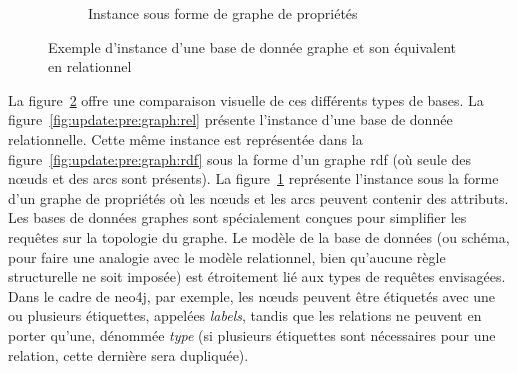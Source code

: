 \begin{figure}[p]
\begin{minipage}[][\textheight][c]{\textwidth}
\begin{subfigure}[t]{\linewidth}
\begin{adjustbox}{width=\linewidth, max height=.25\textheight}
            \end{adjustbox}
            \caption{Instance sous forme de graphe de propriétés}
            \label{fig:update:pre:graph:prop}
        \end{subfigure}
        \caption{Exemple d'instance d'une base de donnée graphe et son équivalent en relationnel}
        \label{fig:update:pre:graph}
    \end{minipage}
\end{figure}

La figure~\ref{fig:update:pre:graph} offre une comparaison visuelle de ces différents types de bases.
La figure~\ref{fig:update:pre:graph:rel} présente l'instance d'une base de donnée relationnelle.
Cette même instance est représentée dans la figure~\ref{fig:update:pre:graph:rdf} sous la forme d'un graphe \gls{rdf} (où seule des nœuds et des arcs sont présents).
La figure~\ref{fig:update:pre:graph:prop} représente l'instance sous la forme d'un graphe de propriétés où les nœuds et les arcs peuvent contenir des attributs.
Les bases de données graphes sont spécialement conçues pour simplifier les requêtes sur la topologie du graphe.
Le modèle de la base de données (ou schéma, pour faire une analogie avec le modèle relationnel, bien qu'aucune règle structurelle ne soit imposée) est étroitement lié aux types de requêtes envisagées.
Dans le cadre de \gls{neo4j}, par exemple, les nœuds peuvent être étiquetés avec une ou plusieurs étiquettes, appelées \emph{labels}, tandis que les relations ne peuvent en porter qu'une, dénommée \emph{type} (si plusieurs étiquettes sont nécessaires pour une relation, cette dernière sera dupliquée).

